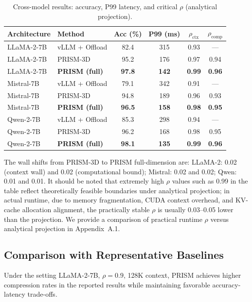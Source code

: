 \documentclass[11pt,a4paper]{article}
\theoremstyle{plain}
\theoremstyle{definition}
\begin{document}
\begin{table}[htbp]
\centering
\caption{Cross-model results: accuracy, P99 latency, and critical $\rho$ (analytical projection).}
\label{tab:cross-model}
\begin{tabular}{llcccc}
\toprule
\textbf{Architecture} & \textbf{Method} & \textbf{Acc (\%)} & \textbf{P99 (ms)} & \textbf{$\rho_{\text{ctx}}$} & \textbf{$\rho_{\text{comp}}$} \\
\midrule
LLaMA-2-7B & vLLM + Offload & 82.4 & 315 & 0.93 & --- \\
LLaMA-2-7B & PRISM-3D & 95.2 & 176 & 0.97 & 0.94 \\
LLaMA-2-7B & \textbf{PRISM (full)} & \textbf{97.8} & \textbf{142} & \textbf{0.99} & \textbf{0.96} \\
\midrule
Mistral-7B & vLLM + Offload & 79.1 & 342 & 0.91 & --- \\
Mistral-7B & PRISM-3D & 94.8 & 189 & 0.96 & 0.93 \\
Mistral-7B & \textbf{PRISM (full)} & \textbf{96.5} & \textbf{158} & \textbf{0.98} & \textbf{0.95} \\
\midrule
Qwen-2-7B & vLLM + Offload & 85.3 & 298 & 0.94 & --- \\
Qwen-2-7B & PRISM-3D & 96.2 & 168 & 0.98 & 0.95 \\
Qwen-2-7B & \textbf{PRISM (full)} & \textbf{98.1} & \textbf{135} & \textbf{0.99} & \textbf{0.96} \\
\bottomrule
\end{tabular}
\end{table}

The wall shifts from PRISM-3D to PRISM full-dimension are: LLaMA-2: 0.02 (context wall) and 0.02 (computational bound); Mistral: 0.02 and 0.02; Qwen: 0.01 and 0.01. It should be noted that extremely high $\rho$ values such as 0.99 in the table reflect theoretically feasible boundaries under analytical projection; in actual runtime, due to memory fragmentation, CUDA context overhead, and KV-cache allocation alignment, the practically stable $\rho$ is usually 0.03--0.05 lower than the projection. We provide a comparison of practical runtime $\rho$ versus analytical projection in Appendix~A.1.

\subsection{Comparison with Representative Baselines}

Under the setting LLaMA-2-7B, $\rho=0.9$, 128K context, PRISM achieves higher compression rates in the reported results while maintaining favorable accuracy-latency trade-offs.
\end{document}
